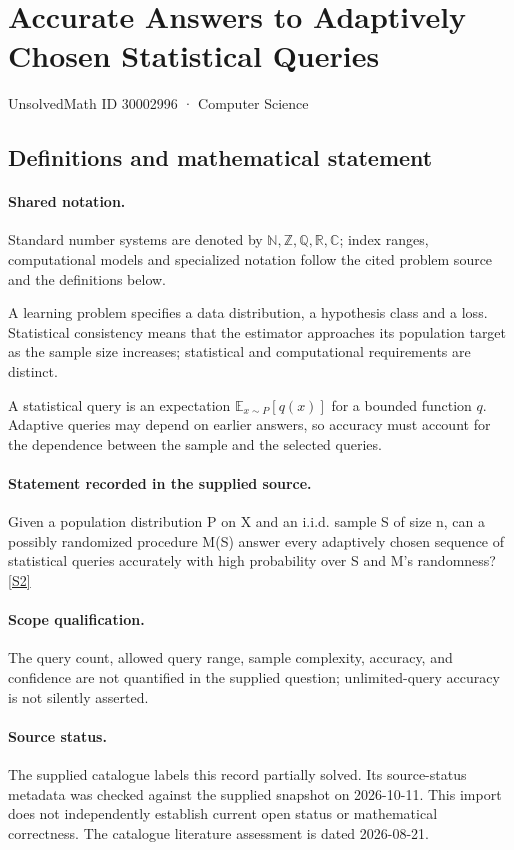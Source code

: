 \documentclass[11pt]{article}
\newcommand{\sref}[2]{\hyperlink{source:#1:#2}{[S#2]}}
\begin{document}
\setcounter{section}{30002995}
\section{Accurate Answers to Adaptively Chosen Statistical Queries}\label{30002996}
{\small\sffamily UnsolvedMath ID 30002996 · Computer Science}
\subsection{Definitions and mathematical statement}

\paragraph{Shared notation.}Standard number systems are denoted by $\mathbb N,\mathbb Z,\mathbb Q,\mathbb R,\mathbb C$; index ranges, computational models and specialized notation follow the cited problem source and the definitions below.


A learning problem specifies a data distribution, a hypothesis class and a loss. Statistical consistency means that the estimator approaches its population target as the sample size increases; statistical and computational requirements are distinct.

A statistical query is an expectation $\mathbb E_{x\sim P}[q(x)]$ for a bounded function $q$. Adaptive queries may depend on earlier answers, so accuracy must account for the dependence between the sample and the selected queries.
\paragraph{Statement recorded in the supplied source.}
Given a population distribution P on X and an i.i.d. sample S of size n, can a possibly randomized procedure M(S) answer every adaptively chosen sequence of statistical queries accurately with high probability over S and M's randomness? \sref{30002996}{2}
\paragraph{Scope qualification.}
The query count, allowed query range, sample complexity, accuracy, and confidence are not quantified in the supplied question; unlimited-query accuracy is not silently asserted.
\paragraph{Source status.}
The supplied catalogue labels this record partially solved. Its source-status metadata was checked against the supplied snapshot on 2026-10-11. This import does not independently establish current open status or mathematical correctness. The catalogue literature assessment is dated 2026-08-21.
\end{document}
